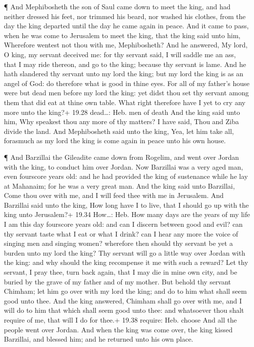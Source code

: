  ¶ And Mephibosheth the son of Saul came down to meet the
king, and had neither dressed his feet, nor trimmed his beard, nor
washed his clothes, from the day the king departed until the day he came
again in peace.  And it came to pass, when he was come to
Jerusalem to meet the king, that the king said unto him, Wherefore
wentest not thou with me, Mephibosheth?  And he answered,
My lord, O king, my servant deceived me: for thy servant said, I will
saddle me an ass, that I may ride thereon, and go to the king; because
thy servant is lame.  And he hath slandered thy servant
unto my lord the king; but my lord the king is as an angel of God: do
therefore what is good in thine eyes.  For all of my
father's house were but dead men before my lord the king: yet didst thou
set thy servant among them that did eat at thine own table. What right
therefore have I yet to cry any more unto the king?+ 19.28 dead\ldots:
Heb. men of death  And the king said unto him, Why speakest
thou any more of thy matters? I have said, Thou and Ziba divide the
land.  And Mephibosheth said unto the king, Yea, let him
take all, forasmuch as my lord the king is come again in peace unto his
own house.

 ¶ And Barzillai the Gileadite came down from Rogelim, and
went over Jordan with the king, to conduct him over Jordan.
 Now Barzillai was a very aged man, even fourscore years
old: and he had provided the king of sustenance while he lay at
Mahanaim; for he was a very great man.  And the king said
unto Barzillai, Come thou over with me, and I will feed thee with me in
Jerusalem.  And Barzillai said unto the king, How long have
I to live, that I should go up with the king unto Jerusalem?+ 19.34
How\ldots: Heb. How many days are the years of my life  I
am this day fourscore years old: and can I discern between good and
evil? can thy servant taste what I eat or what I drink? can I hear any
more the voice of singing men and singing women? wherefore then should
thy servant be yet a burden unto my lord the king?  Thy
servant will go a little way over Jordan with the king: and why should
the king recompense it me with such a reward?  Let thy
servant, I pray thee, turn back again, that I may die in mine own city,
and be buried by the grave of my father and of my mother. But behold thy
servant Chimham; let him go over with my lord the king; and do to him
what shall seem good unto thee.  And the king answered,
Chimham shall go over with me, and I will do to him that which shall
seem good unto thee: and whatsoever thou shalt require of me, that will
I do for thee.+ 19.38 require: Heb. choose  And all the
people went over Jordan. And when the king was come over, the king
kissed Barzillai, and blessed him; and he returned unto his own place.


